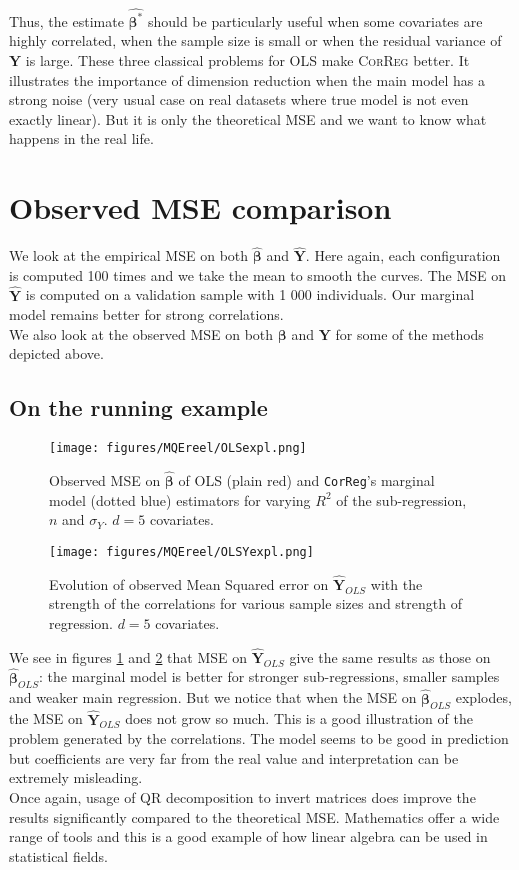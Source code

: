 \documentclass[12pt,a4paper]{report}
\begin{document}
	Thus, the estimate $\hat{\boldsymbol{\beta}^*}$ should be particularly useful when some covariates are highly correlated, when the sample size is small or when the residual variance of $\boldsymbol{Y}$ is large. These three classical problems for OLS make \textsc{CorReg} better. It illustrates the importance of dimension reduction when the main model has a strong noise (very usual case on real datasets where true model is not even exactly linear). 
But it is only the theoretical MSE and we want to know what happens in the real life. 
\section{Observed MSE comparison}\label{MSEvraiS}
We look at the empirical MSE on both $\hat{\boldsymbol{\beta}}$ and $\hat{\boldsymbol{Y}}$. Here again, each configuration is computed 100 times and we take the mean to smooth the curves. The MSE on $\hat{\boldsymbol{Y}}$ is computed on a validation sample with 1 000 individuals. Our marginal model remains better for strong correlations.\\

	We also look at the observed MSE on both $\boldsymbol{\beta}$ and $\boldsymbol{Y}$ for some of the methods depicted above.
	\subsection{On the running example}
 \begin{figure}[h!]
	\texttt{[image: figures/MQEreel/OLSexpl.png]}
	\caption{Observed MSE on $\hat{\boldsymbol{\beta}}$ of OLS (plain red) and {\tt CorReg}'s marginal model (dotted blue) estimators for varying $R^2$ of the sub-regression, $n$ and $\sigma_Y$. $d=5$ covariates.}\label{MSEOLSexpl}
\end{figure} 
	
	 \begin{figure}
	 \centering
	  \texttt{[image: figures/MQEreel/OLSYexpl.png]}
	  \caption{Evolution of observed Mean Squared error on $\hat{\boldsymbol{Y}}_{OLS}$ with the strength of the correlations for various sample sizes and strength of regression. $d=5$ covariates. } \label{MQEOLSYexpl}
	\end{figure}
	We see in figures \ref{MSEOLSexpl} and \ref{MQEOLSYexpl} that MSE on $\hat{\boldsymbol{Y}}_{OLS}$ give the same results as those on $\hat{\boldsymbol{\beta}}_{OLS}$: the marginal model is better for stronger sub-regressions, smaller samples and weaker main regression. But we notice that when the MSE on $\hat{\boldsymbol{\beta}}_{OLS}$ explodes, the MSE on $\hat{\boldsymbol{Y}}_{OLS}$ does not grow so much. This is a good illustration of the problem generated by the correlations. The model seems to be good in prediction but coefficients are very far from the real value and interpretation can be extremely misleading.\\
	Once again, usage of QR decomposition to invert matrices does improve the results significantly compared to the theoretical MSE. Mathematics offer a wide range of tools and this is a good example of how linear algebra can be used in statistical fields. \\
	
\end{document}
